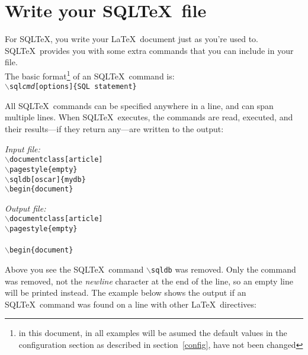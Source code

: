 \documentclass{article}
\newcommand{\bs}{\ensuremath{\backslash}}
\newcommand{\vs}{\vspace{3mm}}
\begin{document}
\section{Write your SQL\TeX\ file}

For SQL\TeX, you write your \LaTeX\ document just as you're used to. SQL\TeX\ provides you with
some extra commands that you can include in your file.\\
The basic format\footnote{in this document, in all examples will be asumed the default values in the
configuration section as described in section~\ref{config}, have not been changed} of an SQL\TeX\ command is: \\
\texttt{\bs sql\emph{cmd}[options]\{SQL statement\}}

\vs

All SQL\TeX\ commands can be specified anywhere in a line, and can span multiple lines.
When SQL\TeX\ executes, the commands are read, executed, and their results---if they return
any---are written to the output:

\vs

\begin{minipage}[t]{0.5\textwidth}\textsl{Input file:}\\\texttt{\footnotesize{\bs documentclass[article] \\
\bs pagestyle\{empty\} \\
\bs sqldb[oscar]\{mydb\} \\
\bs begin\{document\} \\
}}\end{minipage}\hfill\begin{minipage}[t]{0.5\textwidth}\textsl{Output file:}\\\texttt{\footnotesize{\bs documentclass[article] \\
\bs pagestyle\{empty\} \\
 \\
\bs begin\{document\} \\
}}\end{minipage}

\vs

Above you see the SQL\TeX\ command \texttt{\bs sqldb} was removed. Only the command was removed, not
the \textsl{newline} character at the end of the line, so an empty line will be printed instead.
The example below shows the output if an SQL\TeX\ command was found on a line with other \LaTeX\
directives:

\vs
\end{document}
